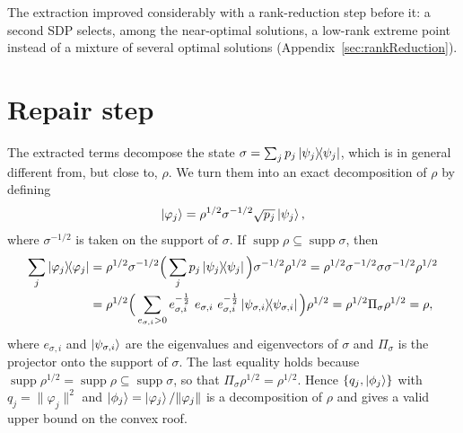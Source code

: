 \documentclass[11pt,a4paper]{report}
\begin{document}
The extraction improved considerably with a rank-reduction step before it: a second SDP selects, among the near-optimal solutions, a low-rank extreme point instead of a mixture of several optimal solutions (Appendix~\ref{sec:rankReduction}).

\section{Repair step}\label{sec:repair}
The extracted terms decompose the state $\sigma=\sum_jp_j\dyad{\psi_j}$, which is in general different from, but close to, $\rho$. We turn them into an exact decomposition of $\rho$ by defining
\begin{equation}\label{eq:repair}
    \ket{\varphi_j} = \rho^{1/2}\sigma^{-1/2}\sqrt{p_j}\ket{\psi_j},
\end{equation}
where $\sigma^{-1/2}$ is taken on the support of $\sigma$. If $\operatorname{supp} \rho \subseteq \operatorname{supp} \sigma$, then
\begin{align}
    \sum_j \dyad{\varphi_j} &= \rho^{1/2}\sigma^{-1/2}\Big(\sum_j p_j\dyad{\psi_j}\Big) \sigma^{-1/2}\rho^{1/2}
    = \rho^{1/2}\sigma^{-1/2}\sigma \sigma^{-1/2}\rho^{1/2}\\
    &= \rho^{1/2}\Big(\sum_{e_{\sigma, i}>0} e_{\sigma, i}^{-\frac{1}{2}}\ e_{\sigma, i} \  e_{\sigma, i}^{-\frac{1}{2}} \dyad{\psi_{\sigma, i}}\Big)\rho^{1/2}
    = \rho^{1/2}\Pi_\sigma\rho^{1/2}
    = \rho,
\end{align}
where $e_{\sigma,i}$ and $\ket{\psi_{\sigma,i}}$ are the eigenvalues and eigenvectors of $\sigma$ and $\Pi_\sigma$ is the projector onto the support of $\sigma$. The last equality holds because $\operatorname{supp}\rho^{1/2}=\operatorname{supp}\rho\subseteq\operatorname{supp}\sigma$, so that $\Pi_\sigma\rho^{1/2}=\rho^{1/2}$. Hence $\{q_j,\ket{\phi_j}\}$ with $q_j = \|\varphi_j\|^2$ and $\ket{\phi_j}=\ket{\varphi_j}/\|\varphi_j\|$ is a decomposition of $\rho$ and gives a valid upper bound on the convex roof.
\end{document}
